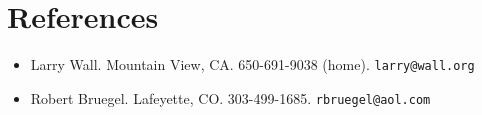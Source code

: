 \documentclass[12pt]{article}
\begin{document}
\section*{References}

\begin{itemize}
\item Larry Wall. Mountain View, CA.  650-691-9038 (home).
\verb|larry@wall.org|
\item Robert Bruegel.  Lafeyette, CO.  303-499-1685.
\verb|rbruegel@aol.com|
\end{itemize}
\end{document}
